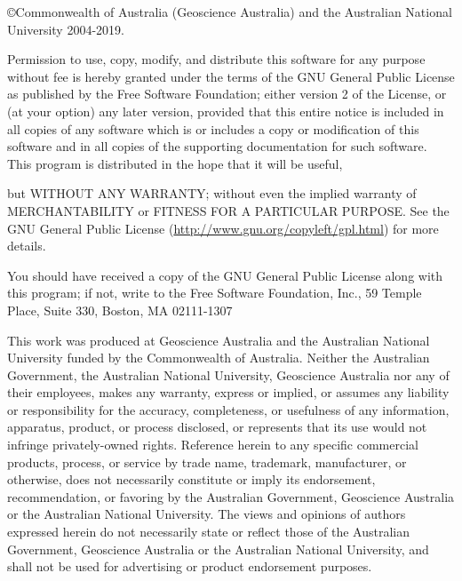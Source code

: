 %
%
%
%
%
%
%
%

\vspace*{0.5in}

\copyright Commonwealth of Australia (Geoscience Australia) and the Australian
National University 2004-2019.

Permission to use, copy, modify, and distribute this software for any
purpose without fee is hereby granted under the terms of the GNU
General Public License as published by the Free Software Foundation;
either version 2 of the License, or (at your option) any later
version, provided that this entire notice is included in all copies
of any software which is or includes a copy or modification of this
software and in all copies of the supporting documentation for such
software.
This program is distributed in the hope that it will be useful,

but WITHOUT ANY WARRANTY; without even the implied warranty of
MERCHANTABILITY or FITNESS FOR A PARTICULAR PURPOSE.  See the
GNU General Public License (\url{http://www.gnu.org/copyleft/gpl.html})
for more details.

You should have received a copy of the GNU General Public License
along with this program; if not, write to the Free Software
Foundation, Inc., 59 Temple Place, Suite 330, Boston, MA  02111-1307

This work was produced at Geoscience Australia and the Australian
National University funded by the Commonwealth of Australia. Neither
the Australian Government, the Australian National University,
Geoscience Australia nor any of their employees, makes any warranty,
express or implied, or assumes any liability or responsibility for
the accuracy, completeness, or usefulness of any information,
apparatus, product, or process disclosed, or represents that its use
would not infringe privately-owned rights. Reference herein to any
specific commercial products, process, or service by trade name,
trademark, manufacturer, or otherwise, does not necessarily
constitute or imply its endorsement, recommendation, or favoring by
the Australian Government, Geoscience Australia or the Australian
National University.  The views and opinions of authors expressed
herein do not necessarily state or reflect those of the Australian
Government, Geoscience Australia or the Australian National
University, and shall not be used for advertising or product
endorsement purposes.

